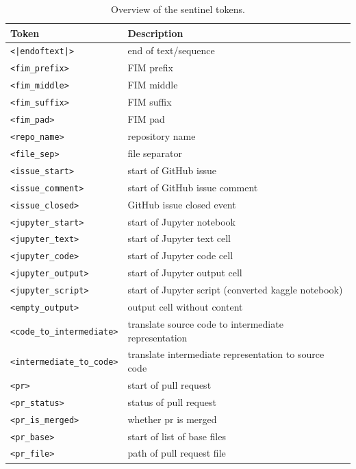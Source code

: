 \documentclass[10pt]{article} %
\begin{document}
\begin{table}[t]
    \caption{Overview of the sentinel tokens.}
    \label{tab:sentinel_tokens}
    \centering
    \begin{tabular}{ll}
    \toprule
    \textbf{Token} & \textbf{Description}\\
    \midrule
    \verb$<|endoftext|>$ & end of text/sequence \\ 
    \verb|<fim_prefix>| & FIM prefix  \\  
    \verb|<fim_middle>| & FIM middle \\
    \verb|<fim_suffix>| & FIM suffix \\
    \verb|<fim_pad>| & FIM pad \\
    \verb|<repo_name>| & repository name \\
    \verb|<file_sep>| & file separator  \\
    \verb|<issue_start>| & start of GitHub issue \\
    \verb|<issue_comment>| & start of GitHub issue comment \\
    \verb|<issue_closed>| & GitHub issue closed event \\
    \verb|<jupyter_start>| & start of Jupyter notebook \\
    \verb|<jupyter_text>| & start of Jupyter text cell \\
    \verb|<jupyter_code>| & start of Jupyter code cell \\
    \verb|<jupyter_output>| & start of Jupyter output cell \\
    \verb|<jupyter_script>| & start of Jupyter script (converted kaggle notebook) \\
    \verb|<empty_output>| & output cell without content \\
    \verb|<code_to_intermediate>| & translate source code to intermediate representation\\
    \verb|<intermediate_to_code>| & translate intermediate representation to source code\\
    \verb|<pr>| & start of pull request\\
    \verb|<pr_status>| & status of pull request\\
    \verb|<pr_is_merged>| & whether pr is merged\\
    \verb|<pr_base>|  & start of list of base files\\
    \verb|<pr_file>| & path of pull request file \\

\end{tabular}
\end{table}
\end{document}
